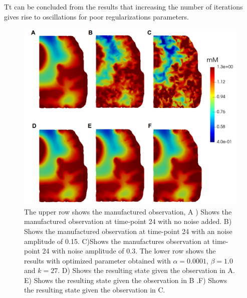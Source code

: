 \documentclass[11pt,a4paper]{article}
\begin{document}
Tt can be concluded from the results that increasing the number of iterations gives rise to oscillations for poor regularizations parameters. 


\begin{figure}
\centering
\includegraphics[scale=0.4]{12-clrscl-0413-regp--40-interp-white-2.png}  
\caption{The upper row shows the manufactured observation, A ) Shows the manufactured observation at time-point 24 with no noise added. B) Shows the manufactured observation at time-point 24 with an noise amplitude of 0.15. C)Shows the manufactures observation at time-point 24 with noise amplitude of 0.3. The lower row shows the results with optimized parameter obtained with $\alpha=0.0001$, $\beta=1.0$ and $k=27$. D) Shows the resulting state given the observation in A. E)  Shows the resulting state given the observation in B .F) Shows the resulting state given the observation in C. }
\label{12hourswithnoise}
\end{figure}
\end{document}
